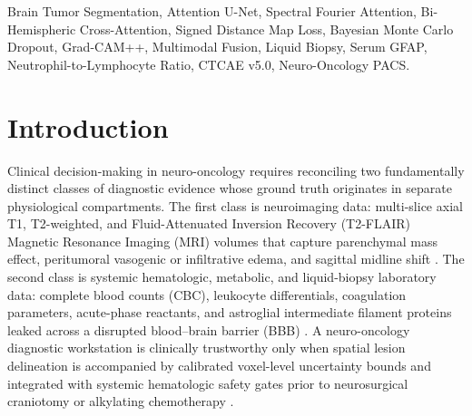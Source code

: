 \documentclass[conference]{IEEEtran}
\begin{document}
\begin{abstract}
Demyelination vs.\ $76.40\%$ for unimodal B0), $99.87\%$ WHO CNS Grade stratification accuracy, $0.9640$ macro ROC-AUC, and zero false-clearance safety leaks across $N_{\text{adv}} = 40$ adversarial hematologic and out-of-distribution upload injections.
\end{abstract}

\begin{IEEEkeywords}
Brain Tumor Segmentation, Attention U-Net, Spectral Fourier Attention, Bi-Hemispheric Cross-Attention, Signed Distance Map Loss, Bayesian Monte Carlo Dropout, Grad-CAM++, Multimodal Fusion, Liquid Biopsy, Serum GFAP, Neutrophil-to-Lymphocyte Ratio, CTCAE v5.0, Neuro-Oncology PACS.
\end{IEEEkeywords}

\section{Introduction}
Clinical decision-making in neuro-oncology requires reconciling two fundamentally distinct classes of diagnostic evidence whose ground truth originates in separate physiological compartments. The first class is neuroimaging data: multi-slice axial T1, T2-weighted, and Fluid-Attenuated Inversion Recovery (T2-FLAIR) Magnetic Resonance Imaging (MRI) volumes that capture parenchymal mass effect, peritumoral vasogenic or infiltrative edema, and sagittal midline shift \cite{menze2015brats, bakas2017advancing, buda2019association}. The second class is systemic hematologic, metabolic, and liquid-biopsy laboratory data: complete blood counts (CBC), leukocyte differentials, coagulation parameters, acute-phase reactants, and astroglial intermediate filament proteins leaked across a disrupted blood--brain barrier (BBB) \cite{bambury2013nlr, perez2021gfap, louis2021who}. A neuro-oncology diagnostic workstation is clinically trustworthy only when spatial lesion delineation is accompanied by calibrated voxel-level uncertainty bounds and integrated with systemic hematologic safety gates prior to neurosurgical craniotomy or alkylating chemotherapy \cite{stupp2005radiotherapy, ctcae2017v5}.
\end{document}
